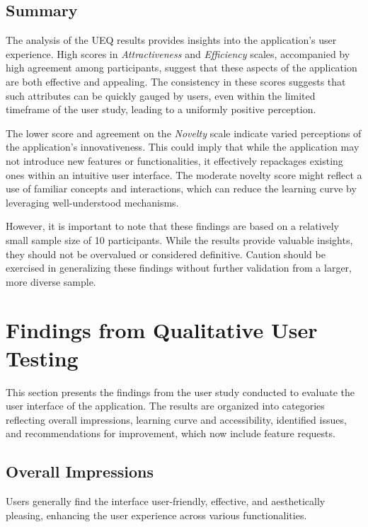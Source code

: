 \subsection*{Summary}

The analysis of the UEQ results provides insights into the application's user experience.
High scores in \emph{Attractiveness} and \emph{Efficiency} scales, accompanied by high agreement among participants, suggest that these aspects of the application are both effective and appealing.
The consistency in these scores suggests that such attributes can be quickly gauged by users, even within the limited timeframe of the user study, leading to a uniformly positive perception.

The lower score and agreement on the \emph{Novelty} scale indicate varied perceptions of the application’s innovativeness.
This could imply that while the application may not introduce new features or functionalities, it effectively repackages existing ones within an intuitive user interface.
The moderate novelty score might reflect a use of familiar concepts and interactions, which can reduce the learning curve by leveraging well-understood mechanisms.

However, it is important to note that these findings are based on a relatively small sample size of 10 participants.
While the results provide valuable insights, they should not be overvalued or considered definitive.
Caution should be exercised in generalizing these findings without further validation from a larger, more diverse sample.

\section{Findings from Qualitative User Testing}
\label{sec:result:qualitative}

This section presents the findings from the user study conducted to evaluate the user interface of the application.
The results are organized into categories reflecting overall impressions, learning curve and accessibility, identified issues, and recommendations for improvement, which now include feature requests.

\subsection*{Overall Impressions}
\label{sec:results:overall_impressions}

Users generally find the interface user-friendly, effective, and aesthetically pleasing, enhancing the user experience across various functionalities. 


